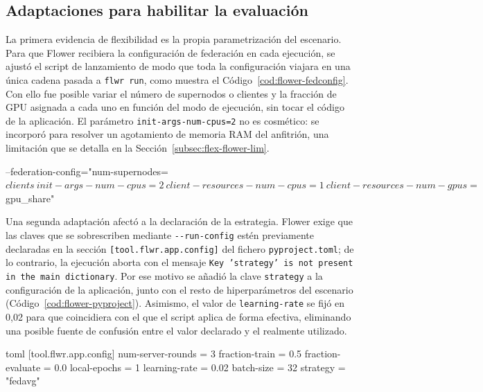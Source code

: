 \subsection{Adaptaciones para habilitar la evaluación}\label{subsec:flex-flower-adapt}

La primera evidencia de flexibilidad es la propia parametrización del escenario.
Para que Flower recibiera la configuración de federación en cada ejecución, se
ajustó el script de lanzamiento de modo que toda la configuración viajara en una
única cadena pasada a \texttt{flwr run}, como muestra el Código~\ref{cod:flower-fedconfig}.
Con ello fue posible variar el número de supernodos o clientes y la fracción de
GPU asignada a cada uno en función del modo de ejecución, sin tocar el código de
la aplicación. El parámetro \texttt{init-args-num-cpus=2} no es cosmético: se
incorporó para resolver un agotamiento de memoria RAM del anfitrión, una
limitación que se detalla en la Sección~\ref{subsec:flex-flower-lim}.

\begin{bashcode}[title={run\_flower\_experiments.sh}, label={cod:flower-fedconfig}]
--federation-config="num-supernodes=$clients \
  init-args-num-cpus=2 \
  client-resources-num-cpus=1 \
  client-resources-num-gpus=$gpu_share"
\end{bashcode}

Una segunda adaptación afectó a la declaración de la estrategia. Flower exige que
las claves que se sobrescriben mediante \texttt{-{}-run-config} estén previamente
declaradas en la sección \texttt{[tool.flwr.app.config]} del fichero
\texttt{pyproject.toml}; de lo contrario, la ejecución aborta con el mensaje
\texttt{Key 'strategy' is not present in the main dictionary}. Por ese
motivo se añadió la clave \texttt{strategy} a la configuración de la aplicación,
junto con el resto de hiperparámetros del escenario (Código~\ref{cod:flower-pyproject}).
Asimismo, el valor de \texttt{learning-rate} se fijó en 0,02 para que coincidiera
con el que el script aplica de forma efectiva, eliminando una posible fuente de
confusión entre el valor declarado y el realmente utilizado.

\begin{codigo}[title={pyproject.toml}, label={cod:flower-pyproject}]{toml}
[tool.flwr.app.config]
num-server-rounds = 3
fraction-train = 0.5
fraction-evaluate = 0.0
local-epochs = 1
learning-rate = 0.02
batch-size = 32
strategy = "fedavg"
\end{codigo}

